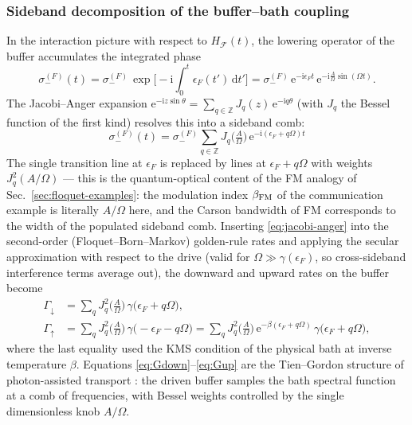 \documentclass[11pt,a4paper]{article}
\theoremstyle{definition}
\theoremstyle{remark}
\newcommand{\ee}{\mathrm{e}}
\newcommand{\ii}{\mathrm{i}}
\renewcommand{\d}{\mathrm{d}}
\newcommand{\bbZ}{\mathbb{Z}}
\begin{document}
\subsubsection{Sideband decomposition of the buffer--bath coupling}
\label{sec:sidebands}
In the interaction picture with respect to $H_\mathcal{F}(t)$, the
lowering operator of the buffer accumulates the integrated phase
\begin{equation}
\sigma_-^{(F)}(t)
= \sigma_-^{(F)}\,
\exp\!\Big[-\ii\!\int_0^t \epsilon_F(t')\,\d t'\Big]
= \sigma_-^{(F)}\,
\ee^{-\ii\epsilon_F t}\,
\ee^{-\ii \frac{A}{\Omega}\sin(\Omega t)} .
\end{equation}
The Jacobi--Anger expansion
$\ee^{-\ii z\sin\theta} = \sum_{q\in\bbZ} J_q(z)\,\ee^{-\ii q\theta}$
(with $J_q$ the Bessel function of the first kind) resolves this into a
sideband comb:
\begin{equation}
\boxed{\;
\sigma_-^{(F)}(t)
= \sigma_-^{(F)} \sum_{q\in\bbZ}
J_q\!\Big(\tfrac{A}{\Omega}\Big)\,
\ee^{-\ii(\epsilon_F + q\Omega)t}
\;}
\label{eq:jacobi-anger}
\end{equation}
The single transition line at $\epsilon_F$ is replaced by lines at
$\epsilon_F+q\Omega$ with weights $J_q^2(A/\Omega)$ --- this is the
quantum-optical content of the FM analogy of
Sec.~\ref{sec:floquet-examples}: the modulation index $\beta_{\rm FM}$
of the communication example is literally $A/\Omega$ here, and the
Carson bandwidth of FM corresponds to the width of the populated
sideband comb. Inserting \eqref{eq:jacobi-anger} into the second-order
(Floquet--Born--Markov) golden-rule rates and applying the secular
approximation with respect to the drive (valid for
$\Omega \gg \gamma(\epsilon_F)$, so cross-sideband interference terms
average out), the downward and upward rates on the buffer become
\begin{align}
\Gamma_\downarrow
&= \sum_{q} J_q^2\!\Big(\tfrac{A}{\Omega}\Big)\,
\gamma\big(\epsilon_F + q\Omega\big),
\label{eq:Gdown}\\
\Gamma_\uparrow
&= \sum_{q} J_q^2\!\Big(\tfrac{A}{\Omega}\Big)\,
\gamma\big(-\epsilon_F - q\Omega\big)
= \sum_{q} J_q^2\!\Big(\tfrac{A}{\Omega}\Big)\,
\ee^{-\beta(\epsilon_F+q\Omega)}\,
\gamma\big(\epsilon_F + q\Omega\big),
\label{eq:Gup}
\end{align}
where the last equality used the KMS condition of the physical bath at
inverse temperature $\beta$. Equations
\eqref{eq:Gdown}--\eqref{eq:Gup} are the Tien--Gordon structure of
photon-assisted transport \cite{TienGordon1963,Grifoni1998}: the driven
buffer samples the bath spectral function at a comb of frequencies,
with Bessel weights controlled by the single dimensionless knob
$A/\Omega$.
 
\end{document}
